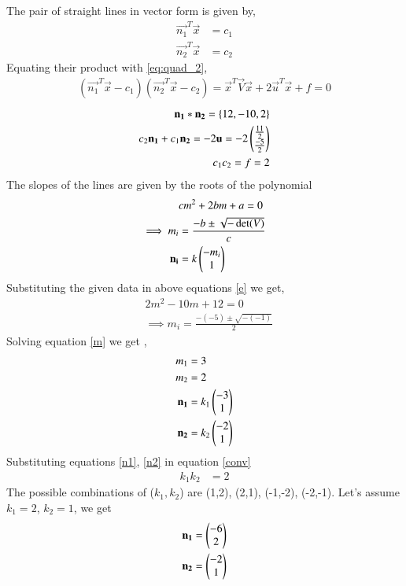 \documentclass[journal,12pt,twocolumn]{IEEEtran}
\begin{document}
The pair of straight lines in vector form is given by, 
\begin{align}
    \vec{n_1}^T\vec{x}&=c_1\label{m1}\\
    \vec{n_2}^T\vec{x}&=c_2\label{m2}
\end{align}
Equating their product with \eqref{eq:quad_2}, 
\begin{align}
    (\vec{n_1}^T\vec{x}-c_1)(\vec{n_2}^T\vec{x}-c_2)
    = \vec{x}^T\vec{V}\vec{x}+2\vec{u}^T\vec{x}+f=0
\end{align}
\begin{align}
\mathbf{n_1}*\mathbf{n_2}=\{12,-10,2\}\label{conv}\\
c_2\mathbf{n_1}+c_1\mathbf{n_2} = -2\mathbf{u} =  -2\begin{pmatrix}\frac{11}{2}\\ \frac{-5}{2}\end{pmatrix} \label{eqc1c2}\\
c_1c_2 = f = 2
\end{align}
The slopes of the lines are given by the roots of the polynomial 
\begin{align}
    &cm^2+2bm+a=0\label{e}\\
    \implies m_i&=\frac{-b\pm{\sqrt{-\det(V)}}}{c}\\
    \mathbf{n_i}&=k\begin{pmatrix}-m_i\\1\end{pmatrix}
\end{align}
Substituting the given data in above equations \eqref{e} we get,
\begin{align}
    &2m^2 -10m + 12 = 0\\
    &\implies m_i = \frac{-(-5)\pm{\sqrt{-(-1)}}}{2}\label{m}
\end{align}
Solving equation \eqref{m} we get ,
\begin{align}
    m_1&= 3 \\
    m_2&= 2 \\
    \mathbf{n_1}&=k_1\begin{pmatrix}-3 \\ 1\end{pmatrix}\label{n1}\\
    \mathbf{n_2}&=k_2\begin{pmatrix}-2 \\ 1\end{pmatrix}\label{n2}
\end{align}
Substituting equations \eqref{n1}, \eqref{n2} in equation \eqref{conv} 
\begin{align}
    k_1k_2 &= 2
\end{align}
The possible combinations of ($k_1,k_2$) are (1,2), (2,1), (-1,-2), (-2,-1). 
Let's assume $k_1=2$, $k_2=1$, we get 
\begin{align}
    \mathbf{n_1}&=\begin{pmatrix}-6 \\ 2\end{pmatrix}\label{n11}\\
    \mathbf{n_2}&=\begin{pmatrix}-2 \\ 1\end{pmatrix}\label{n22}
\end{align}
\end{document}
